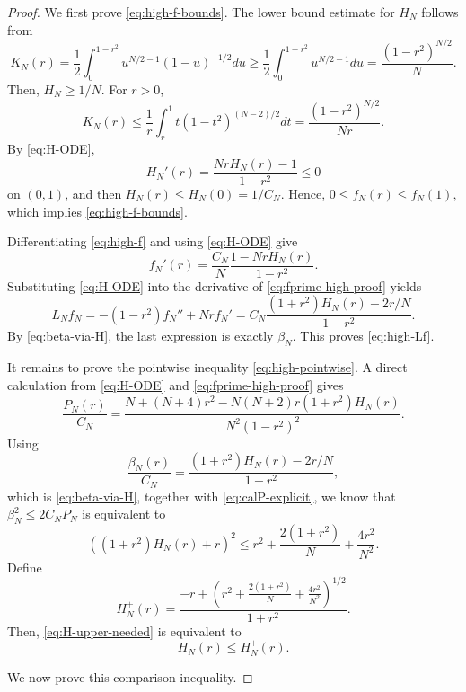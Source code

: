 \documentclass[11pt,letterpaper]{amsart}
\theoremstyle{definition}
\theoremstyle{remark}
\numberwithin{equation}{section}
\begin{document}
\begin{proof}
We first prove \eqref{eq:high-f-bounds}. The lower bound estimate for $H_N$ follows from 
\[K_N(r)=\frac{1}{2} \int_0^{1-r^2} u^{N / 2-1}(1-u)^{-1 / 2} d u \geq \frac{1}{2} \int_0^{1-r^2} u^{N / 2-1} d u=\frac{\left(1-r^2\right)^{N / 2}}{N}.\]
Then, $H_N \ge 1/N$. For $r>0$,
\[
K_N(r) \leq \frac{1}{r} \int_r^1 t\left(1-t^2\right)^{(N-2) / 2} d t=\frac{\left(1-r^2\right)^{N / 2}}{N r}.
\]
By \eqref{eq:H-ODE},
\[
 H_N'(r)=\frac{NrH_N(r)-1}{1-r^2}\le0
\]
on $(0,1)$, and then $H_N(r)\le H_N(0)=1/C_N$.  Hence, $ 0\le f_N(r)\le f_N(1),$ which implies \eqref{eq:high-f-bounds}.

Differentiating \eqref{eq:high-f} and using \eqref{eq:H-ODE} give
\begin{equation}\label{eq:fprime-high-proof}
 f_N'(r)=\frac{C_N}{N}\frac{1-NrH_N(r)}{1-r^2}.
\end{equation}
Substituting \eqref{eq:H-ODE} into the derivative of \eqref{eq:fprime-high-proof} yields
\[
 L_Nf_N=-(1-r^2)f_N''+Nrf_N'
 =C_N\frac{(1+r^2)H_N(r)-2r/N}{1-r^2}.
\]
By \eqref{eq:beta-via-H}, the last expression is exactly $\beta_N$. This proves \eqref{eq:high-Lf}.

It remains to prove the pointwise inequality \eqref{eq:high-pointwise}.  A direct calculation from \eqref{eq:H-ODE} and \eqref{eq:fprime-high-proof} gives 
\begin{equation}\label{eq:calP-explicit}
 \frac{P_N(r)}{C_N}
 =\frac{N+(N+4)r^2-N(N+2)r(1+r^2)H_N(r)}{N^2(1-r^2)^2}.
\end{equation}
Using 
\[
\frac{\beta_N(r)}{C_N}=\frac{\left(1+r^2\right) H_N(r)-2 r / N}{1-r^2},
\]
which is \eqref{eq:beta-via-H}, together with \eqref{eq:calP-explicit}, we know that
$\beta_N^2\le2C_NP_N$ is equivalent to
\begin{equation}\label{eq:H-upper-needed}
 \left((1+r^2)H_N(r)+r\right)^2
 \le
 r^2+\frac{2(1+r^2)}{N}+\frac{4r^2}{N^2}.
\end{equation}
Define
\begin{equation}\label{eq:Hplus}
 H_N^+(r)=
 \frac{-r+\left(r^2+\frac{2(1+r^2)}{N}+\frac{4r^2}{N^2}\right)^{1/2}}
 {1+r^2}.
\end{equation}
Then, \eqref{eq:H-upper-needed} is equivalent to
\begin{equation}\label{eq:HleHplus}
 H_N(r)\le H_N^+(r).
\end{equation}

We now prove this comparison inequality.


\end{proof}
\end{document}
